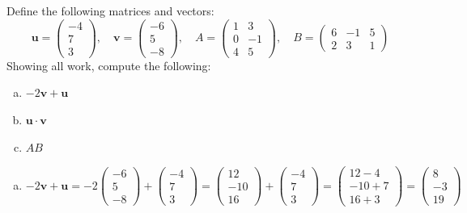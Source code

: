 \documentclass[12pt,letterpaper]{exam}
\begin{document}
\begin{questions}
\newpage
\question[10] Define the following matrices and vectors:
	\[
	\mathbf{u}= \begin{pmatrix} -4 \\ 7 \\ 3 \end{pmatrix}, \quad 
	\mathbf{v}= \begin{pmatrix} -6 \\ 5 \\ -8 \end{pmatrix}, \quad
	A= \begin{pmatrix} 1 & 3 \\ 0 & -1 \\ 4 & 5 \end{pmatrix}, \quad 
	B= \begin{pmatrix} 6 & -1 & 5 \\ 2 & 3 & 1 \end{pmatrix}
	\]
Showing all work, compute the following:
	\begin{enumerate}[(a)]
	\item $-2\mathbf{v} + \mathbf{u}$
	\item $\mathbf{u} \cdot \mathbf{v}$
	\item $AB$
	\end{enumerate} \pspace

\sol 
\begin{enumerate}[(a)]
\item 
	\[
	-2\mathbf{v} + \mathbf{u}= -2 \begin{pmatrix} -6 \\ 5 \\ -8 \end{pmatrix} + \begin{pmatrix} -4 \\ 7 \\ 3 \end{pmatrix}= \begin{pmatrix} 12 \\ -10 \\ 16 \end{pmatrix} + \begin{pmatrix} -4 \\ 7 \\ 3 \end{pmatrix}= \begin{pmatrix} 12 - 4 \\ -10 + 7 \\ 16 + 3 \end{pmatrix}= \begin{pmatrix} 8 \\ -3 \\ 19 \end{pmatrix}
	\] \pspace


\end{enumerate}
\end{questions}
\end{document}
